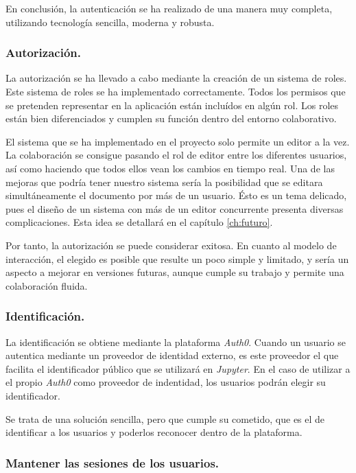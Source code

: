 \documentclass[11pt,spanish,listoffigures]{tfgetsinf}
\begin{document}
En conclusión, la autenticación se ha realizado de una manera muy completa, utilizando tecnología sencilla, moderna y robusta.

\subsubsection{Autorización.}

La autorización se ha llevado a cabo mediante la creación de un sistema de roles. Este sistema de roles se ha implementado correctamente. Todos los permisos que se pretenden representar en la aplicación están incluídos en algún rol. Los roles están bien diferenciados y cumplen su función dentro del entorno colaborativo. 

El sistema que se ha implementado en el proyecto solo permite un editor a la vez. La colaboración se consigue pasando el rol de editor entre los diferentes usuarios, así como haciendo que todos ellos vean los cambios en tiempo real. Una de las mejoras que podría tener nuestro sistema sería la posibilidad que se editara simultáneamente el documento por más de un usuario. Ésto es un tema delicado, pues el diseño de un sistema con más de un editor concurrente presenta diversas complicaciones. Esta idea se detallará en el capítulo \ref{ch:futuro}.

Por tanto, la autorización se puede considerar exitosa. En cuanto al modelo de interacción, el elegido es posible que resulte un poco simple y limitado, y sería un aspecto a mejorar en versiones futuras, aunque cumple su trabajo y permite una colaboración fluida. 

\subsubsection{Identificación.}

La identificación se obtiene mediante la plataforma \textit{Auth0}. Cuando un usuario se autentica mediante un proveedor de identidad externo, es este proveedor el que facilita el identificador público que se utilizará en \textit{Jupyter}. En el caso de utilizar a el propio \textit{Auth0} como proveedor de indentidad, los usuarios podrán elegir su identificador. 

Se trata de una solución sencilla, pero que cumple su cometido, que es el de identificar a los usuarios y poderlos reconocer dentro de la plataforma.

\subsubsection{Mantener las sesiones de los usuarios.}
\label{subsec:objetivos-conc-session}
\end{document}
